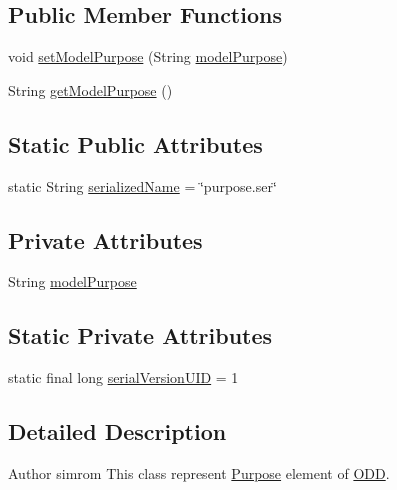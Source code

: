 \subsection*{Public Member Functions}
\begin{DoxyCompactItemize}
\item 
void \hyperlink{classit_1_1isislab_1_1masonassisteddocumentation_1_1_o_d_d_1_1_purpose_ac67fcd9625c53683097b633be723f980}{set\-Model\-Purpose} (String \hyperlink{classit_1_1isislab_1_1masonassisteddocumentation_1_1_o_d_d_1_1_purpose_ad09e90f4c22f6070398aa528c1fc3f53}{model\-Purpose})
\item 
String \hyperlink{classit_1_1isislab_1_1masonassisteddocumentation_1_1_o_d_d_1_1_purpose_a9b6a17d745b00921d85d4c0c3b2bdde9}{get\-Model\-Purpose} ()
\end{DoxyCompactItemize}
\subsection*{Static Public Attributes}
\begin{DoxyCompactItemize}
\item 
static String \hyperlink{classit_1_1isislab_1_1masonassisteddocumentation_1_1_o_d_d_1_1_purpose_ab266424bfc9867b998d2beec32c48a87}{serialized\-Name} = \char`\"{}purpose.\-ser\char`\"{}
\end{DoxyCompactItemize}
\subsection*{Private Attributes}
\begin{DoxyCompactItemize}
\item 
String \hyperlink{classit_1_1isislab_1_1masonassisteddocumentation_1_1_o_d_d_1_1_purpose_ad09e90f4c22f6070398aa528c1fc3f53}{model\-Purpose}
\end{DoxyCompactItemize}
\subsection*{Static Private Attributes}
\begin{DoxyCompactItemize}
\item 
static final long \hyperlink{classit_1_1isislab_1_1masonassisteddocumentation_1_1_o_d_d_1_1_purpose_aabfd879a5b409631066010578ae8ae38}{serial\-Version\-U\-I\-D} = 1
\end{DoxyCompactItemize}


\subsection{Detailed Description}
\begin{DoxyAuthor}{Author}
simrom This class represent \hyperlink{classit_1_1isislab_1_1masonassisteddocumentation_1_1_o_d_d_1_1_purpose}{Purpose} element of \hyperlink{classit_1_1isislab_1_1masonassisteddocumentation_1_1_o_d_d_1_1_o_d_d}{O\-D\-D}. 
\end{DoxyAuthor}


